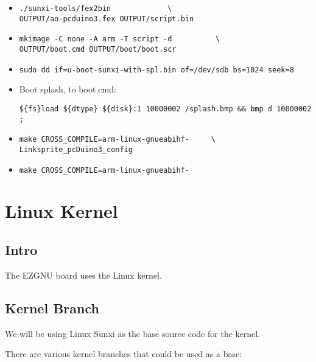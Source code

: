 \begin{itemize}
  \item{
  \begin{verbatim}
./sunxi-tools/fex2bin             \
OUTPUT/ao-pcduino3.fex OUTPUT/script.bin
  \end{verbatim}
  }

  \item{\begin{verbatim}
mkimage -C none -A arm -T script -d          \
OUTPUT/boot.cmd OUTPUT/boot/boot.scr
  \end{verbatim}
  }

  \item{
  \begin{verbatim}
sudo dd if=u-boot-sunxi-with-spl.bin of=/dev/sdb bs=1024 seek=8
  \end{verbatim}
  }

  \item{Boot splash, to boot.cmd:
  
  \verb|${fs}load ${dtype} ${disk}:1 10000002 /splash.bmp && bmp d 10000002 ;|
  }

  \item{
  \begin{verbatim}
make CROSS_COMPILE=arm-linux-gnueabihf-     \
Linksprite_pcDuino3_config
  \end{verbatim}
  }

  \item{
  \verb|make CROSS_COMPILE=arm-linux-gnueabihf-|
  }

\end{itemize}


\section{Linux Kernel}

\subsection{Intro}

The EZGNU board uses the Linux kernel.


\subsection{Kernel Branch}

We will be using Linux Sunxi as the base source code for the kernel.


There are various kernel branches that could be used as a base:

